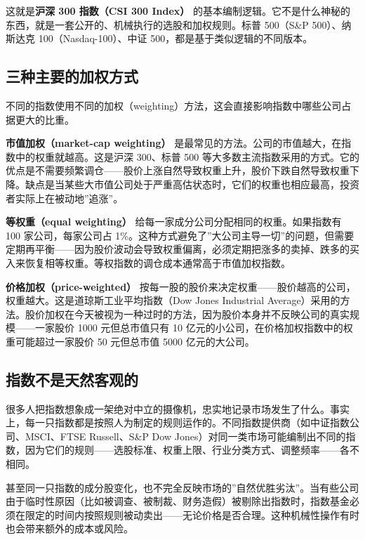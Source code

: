 \documentclass[a4paper,11pt,oneside,fontset=none,UTF8,zihao=-4]{ctexbook}
\begin{document}
这就是\textbf{沪深 300 指数（CSI 300 Index）}
的基本编制逻辑。它不是什么神秘的东西，就是一套公开的、机械执行的选股和加权规则。标普
500（S\&P 500）、纳斯达克 100（Nasdaq-100）、中证
500，都是基于类似逻辑的不同版本。

\subsection{三种主要的加权方式}\label{ux4e09ux79cdux4e3bux8981ux7684ux52a0ux6743ux65b9ux5f0f}

不同的指数使用不同的加权（weighting）方法，这会直接影响指数中哪些公司占据更大的比重。

\textbf{市值加权（market-cap weighting）}
是最常见的方法。公司的市值越大，在指数中的权重就越高。这是沪深 300、标普
500
等大多数主流指数采用的方式。它的优点是不需要频繁调仓------股价上涨自然导致权重上升，股价下跌自然导致权重下降。缺点是当某些大市值公司处于严重高估状态时，它们的权重也相应最高，投资者实际上在被动地''追涨''。

\textbf{等权重（equal weighting）}
给每一家成分公司分配相同的权重。如果指数有 100 家公司，每家公司占
1\%。这种方式避免了''大公司主导一切''的问题，但需要定期再平衡------因为股价波动会导致权重偏离，必须定期把涨多的卖掉、跌多的买入来恢复相等权重。等权指数的调仓成本通常高于市值加权指数。

\textbf{价格加权（price-weighted）}
按每一股的股价来决定权重------股价越高的公司，权重越大。这是道琼斯工业平均指数（Dow
Jones Industrial
Average）采用的方法。股价加权在今天被视为一种过时的方法，因为股价本身并不反映公司的真实规模------一家股价
1000 元但总市值只有 10
亿元的小公司，在价格加权指数中的权重可能超过一家股价 50 元但总市值 5000
亿元的大公司。

\subsection{指数不是天然客观的}\label{ux6307ux6570ux4e0dux662fux5929ux7136ux5ba2ux89c2ux7684}

很多人把指数想象成一架绝对中立的摄像机，忠实地记录市场发生了什么。事实上，每一只指数都是按照人为制定的规则运作的。不同指数提供商（如中证指数公司、MSCI、FTSE
Russell、S\&P Dow
Jones）对同一类市场可能编制出不同的指数，因为它们的规则------选股标准、权重上限、行业分类方式、调整频率------各不相同。

甚至同一只指数的成分股变化，也不完全反映市场的''自然优胜劣汰''。当有些公司由于临时性原因（比如被调查、被制裁、财务造假）被剔除出指数时，指数基金必须在限定的时间内按照规则被动卖出------无论价格是否合理。这种机械性操作有时也会带来额外的成本或风险。
\end{document}
